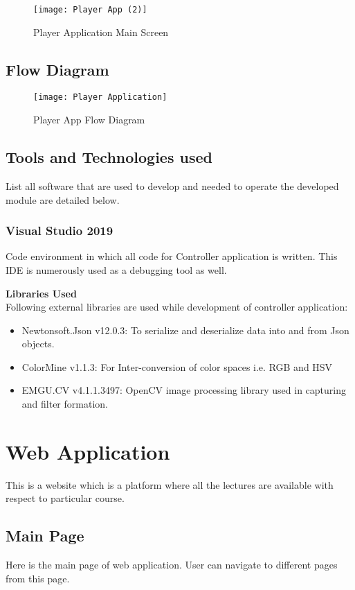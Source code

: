\begin{figure}[h]
  \centering
  \texttt{[image: Player App (2)]}
  \caption{Player Application Main Screen}
\end{figure}

\newpage
\subsection{Flow Diagram}
\begin{figure}[h]
  \centering
  \texttt{[image: Player Application]}
  \caption{Player App Flow Diagram}
\end{figure}

\subsection{Tools and Technologies used}
List all software that are used to develop and needed to operate the developed module are detailed below.

\subsubsection{Visual Studio 2019}
Code environment in which all code for Controller application is written. This IDE is numerously used as a debugging tool as well.

\textbf{Libraries Used}\\
Following external libraries are used while development of controller application:

\begin{itemize}

\item Newtonsoft.Json v12.0.3: To serialize and deserialize data into and from Json objects.
\item ColorMine v1.1.3: For Inter-conversion of color spaces i.e. RGB and HSV
\item EMGU.CV v4.1.1.3497: OpenCV image processing library used in capturing and filter formation.

\end{itemize}

\section{Web Application}
This is a website which is a platform where all the lectures are available with respect to particular course.

\subsection{Main Page}
Here is the main page of web application. User can navigate to different pages from this page. 

